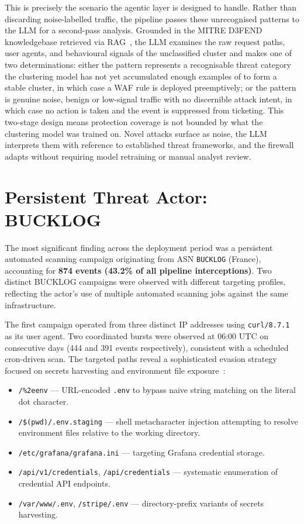 \documentclass[12pt, a4paper]{report}   %
\begin{document}
This is precisely the scenario the agentic layer is designed
to handle. Rather than discarding noise-labelled traffic, the
pipeline passes these unrecognised patterns to the LLM for a
second-pass analysis. Grounded in the MITRE D3FEND
knowledgebase retrieved via RAG~\cite{d3fend}, the LLM
examines the raw request paths, user agents, and behavioural
signals of the unclassified cluster and makes one of two
determinations: either the pattern represents a recognisable
threat category the clustering model has not yet accumulated
enough examples of to form a stable cluster, in which case a
WAF rule is deployed preemptively; or the pattern is genuine
noise, benign or low-signal traffic with no discernible
attack intent, in which case no action is taken and the
event is suppressed from ticketing. This two-stage design
means protection coverage is not bounded by what the
clustering model was trained on. Novel attacks surface as
noise, the LLM interprets them with reference to established
threat frameworks, and the firewall adapts without requiring
model retraining or manual analyst review.

\section{Persistent Threat Actor: BUCKLOG}
\label{sec:bucklog}

The most significant finding across the deployment period was
a persistent automated scanning campaign originating from ASN
\texttt{BUCKLOG} (France), accounting for \textbf{874 events
(43.2\% of all pipeline interceptions)}. Two distinct BUCKLOG
campaigns were observed with different targeting profiles,
reflecting the actor's use of multiple automated scanning jobs
against the same infrastructure.

The first campaign operated from three distinct IP addresses
using \texttt{curl/8.7.1} as its user agent. Two coordinated
bursts were observed at 06:00 UTC on consecutive days (444 and
391 events respectively), consistent with a scheduled
cron-driven scan. The targeted paths reveal a sophisticated
evasion strategy focused on secrets harvesting and environment
file exposure~\cite{owasp-api8,github-sensitive-data}:

\begin{itemize}
  \item \texttt{/\%2eenv} --- URL-encoded \texttt{.env} to
        bypass naive string matching on the literal dot
        character.
  \item \texttt{/\$(pwd)/.env.staging} --- shell metacharacter
        injection attempting to resolve environment files
        relative to the working directory.
  \item \texttt{/etc/grafana/grafana.ini} --- targeting Grafana
        credential storage.
  \item \texttt{/api/v1/credentials}, \texttt{/api/credentials}
        --- systematic enumeration of credential API endpoints.
  \item \texttt{/var/www/.env}, \texttt{/stripe/.env} ---
        directory-prefix variants of secrets harvesting.
\end{itemize}
\end{document}

